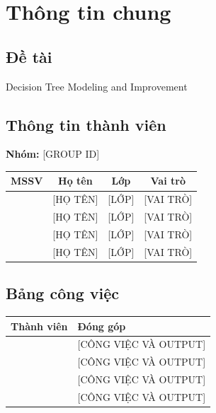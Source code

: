 \chapter*{Thông tin chung}

\section*{Đề tài}
Decision Tree Modeling and Improvement

\section*{Thông tin thành viên}
\textbf{Nhóm:} [GROUP ID]

\begin{table}[H]
\centering
\begin{tabular}{|c|c|c|c|}
    \hline
    \textbf{MSSV} & \textbf{Họ tên} & \textbf{Lớp} & \textbf{Vai trò} \\ \hline
    [MSSV] & [HỌ TÊN] & [LỚP] & [VAI TRÒ] \\ \hline
    [MSSV] & [HỌ TÊN] & [LỚP] & [VAI TRÒ] \\ \hline
    [MSSV] & [HỌ TÊN] & [LỚP] & [VAI TRÒ] \\ \hline
    [MSSV] & [HỌ TÊN] & [LỚP] & [VAI TRÒ] \\ \hline
\end{tabular}
\end{table}

\section*{Bảng công việc}
\begin{table}[H]
\centering
\begin{tabular}{|c|p{10cm}|}
    \hline
    \textbf{Thành viên} & \textbf{Đóng góp} \\ \hline
    [HỌ TÊN] & [CÔNG VIỆC VÀ OUTPUT] \\ \hline
    [HỌ TÊN] & [CÔNG VIỆC VÀ OUTPUT] \\ \hline
    [HỌ TÊN] & [CÔNG VIỆC VÀ OUTPUT] \\ \hline
    [HỌ TÊN] & [CÔNG VIỆC VÀ OUTPUT] \\ \hline
\end{tabular}
\end{table}
